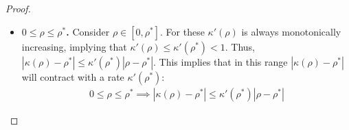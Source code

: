 \documentclass[twoside]{article}
\theoremstyle{definition}
\begin{document}
\begin{proof}
\begin{itemize}

\item \textbf{$0\le \rho \le \rho^*$.}
Consider $\rho \in [0,\rho^*]$. For these $\kappa'(\rho)$ is always monotonically increasing, implying that $\kappa'(\rho)\le \kappa'(\rho^*) < 1$. Thus, $|\kappa(\rho)-\rho^*| \le \kappa'(\rho^*) |\rho - \rho^*|$. This implies that in this range $|\kappa(\rho)-\rho^*|$ will contract with a rate $\kappa'(\rho^*)$:
\begin{align*}
0\le \rho \le \rho^* \implies |\kappa(\rho) - \rho^*| \le \kappa'(\rho^*) |\rho-\rho^*|
\end{align*}


\end{itemize}
\end{proof}
\end{document}

